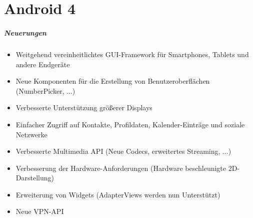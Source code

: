 \part{Android 4}
\frame{\partpage}
\begin{frame}[label=android_four]
   \frametitle{Neuerungen}
   \begin{itemize}
      \item Weitgehend vereinheitlichtes GUI-Framework für Smartphones, Tablets und 
         andere Endgeräte
      \item Neue Komponenten für die Erstellung von Benutzeroberflächen (NumberPicker, ...)
      \item Verbesserte Unterstützung größerer Displays
      \item Einfacher Zugriff auf Kontakte, Profildaten, Kalender-Einträge 
         und soziale Netzwerke
      \item Verbesserte Multimedia API (Neue Codecs, erweitertes Streaming, ...)
      \item Verbesserung der Hardware-Anforderungen (Hardware beschleunigte 2D-Darstellung)
      \item Erweiterung von Widgets (AdapterViews werden nun Unterstützt)
      \item Neue VPN-API
   \end{itemize}
\end{frame}
